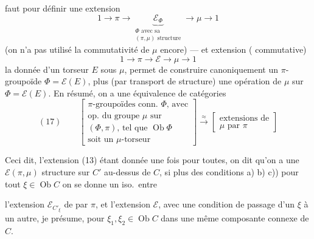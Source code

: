\documentclass[11pt,a4paper]{article}
\begin{document}
faut pour définir une extension
\[
  1 \longrightarrow \pi \longrightarrow
  \underbrace{\mathcal{E}_\Phi}_{\substack{\Phi \text{ avec sa}\\ (\pi,\mu)\text{ structure}}}
  \longrightarrow \mu \longrightarrow 1
\]
 (on n'a pas utilisé la commutativité de $\mu$ encore) — et 
  extension (  commutative)
\[
  1 \longrightarrow \pi \longrightarrow \mathcal{E} \longrightarrow \mu \longrightarrow 1
\]
 la donnée d'un torseur $E$ sous $\mu$, permet de construire canoniquement un
$\pi$-groupoïde $\Phi = \mathcal{E}(E)$, plus (par transport de structure) une opération de
$\mu$ sur $\Phi = \mathcal{E}(E)$. En résumé, on a  une équivalence de catégories
\[
  (17) \qquad
  \left[\begin{array}{l}
    \pi\text{-groupoïdes conn.\ } \Phi\text{, avec}\\
    \text{op.\ du groupe } \mu \text{ sur}\\
    (\Phi, \pi)\text{, tel que } \operatorname{Ob}\Phi\\
    \text{soit un } \mu\text{-torseur}
  \end{array}\right]
  \xrightarrow{\;\approx\;}
  \left[\begin{array}{l}
    \text{extensions de}\\
    \mu \text{ par } \pi
  \end{array}\right]
\]

Ceci dit, l'extension (13) étant donnée une fois pour toutes, on dit qu'on a une
$\mathcal{E}(\pi, \mu)$ structure sur $C'$ au-dessus de $C$, si \struck{\ill{}}  plus
des conditions a) b) c)) pour tout $\xi \in \operatorname{Ob} C$ on se donne un iso.\ entre


l'extension $\mathcal{E}_{C'_\xi}$ de \struck{$\mu$} \add{$\mu$} par $\pi$, et l'extension
$\mathcal{E}$, avec une condition de passage d'un \struck{\ill{}} $\xi$ à un autre, je présume,
pour $\xi_1, \xi_2 \in \operatorname{Ob} C$ dans une même composante connexe de $C$.
\end{document}
